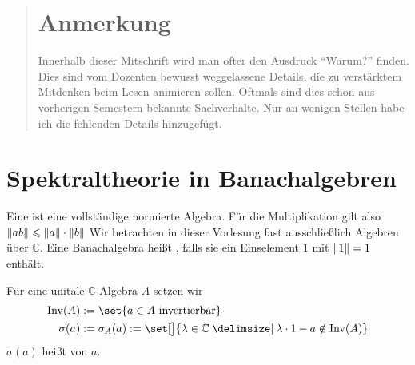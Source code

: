 
\newcommand{\fach}{Operatoralgebren}
\newcommand{\semester}{WiSe 2015}
\newcommand{\homepage}{https://wwwmath.uni-muenster.de/u/wilhelm.winter/wwinter/operatoralgebren.html}

\newcommand{\prof}{Prof.\ Dr.\ Wilhelm Winter}



\maketitle
\begin{abstract}

\section*{Anmerkung}
Innerhalb dieser Mitschrift wird man öfter den Ausdruck \enquote{Warum?} finden. Dies sind vom Dozenten bewusst weggelassene Details, die zu verstärktem Mitdenken beim Lesen 
animieren sollen. Oftmals sind dies schon aus vorherigen Semestern bekannte Sachverhalte. Nur an wenigen Stellen habe ich die fehlenden Details hinzugefügt.
\end{abstract}

\tableofcontents
\cleardoubleoddemptypage

\setcounter{page}{1}
\setcounter{footnote}{0}

\section{Spektraltheorie in Banachalgebren} %
\label{sec:1}

\begin{definition}[{name=[Banachalgebra]}]
	Eine  ist eine vollständige normierte Algebra. Für die Multiplikation gilt also $\norm{a b} \le \norm{a} \cdot \norm{b}$
	Wir betrachten in dieser Vorlesung fast ausschließlich Algebren über $\mathds{C}$. Eine Banachalgebra heißt , falls sie ein Einselement $1$ mit $\norm{1} =1$ 
	enthält. 
\end{definition}

\begin{definition}[{name=[Menge der invertierbaren Elemente und Spektrum]}]
	Für eine unitale $\mathds{C}$-Algebra $A$ setzen wir 
	\begin{align}
		\Inv(A) &:= \set{a \in A  \text{ invertierbar} } \\
		\sigma(a) &:=\sigma_A(a) := \set[\big]{\lambda \in \mathds{C} \given \lambda \cdot 1 - a \notin \Inv(A)}
	\end{align}
	$\sigma(a)$ heißt  von $a$. 
\end{definition}

